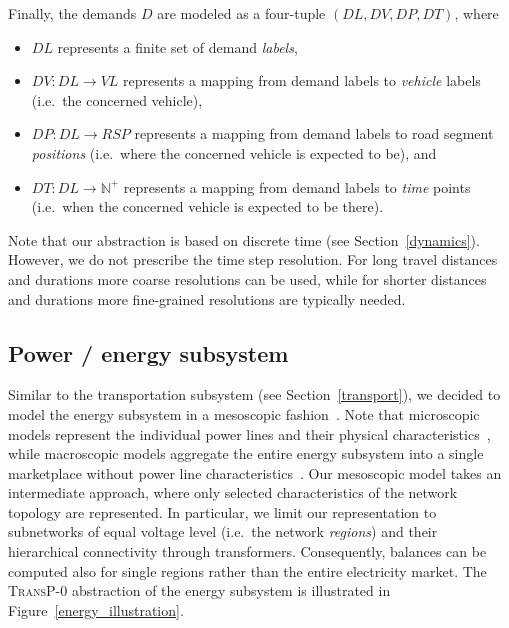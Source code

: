 Finally, the demands $D$ are modeled as a four-tuple $(DL, DV, DP, DT)$, where
\begin{itemize}
	\item $DL$ represents a finite set of demand \textit{labels},
	\item $DV: DL \rightarrow VL$ represents a mapping from demand labels to \textit{vehicle} labels (i.e.\ the concerned vehicle),
	\item $DP: DL \rightarrow RSP$ represents a mapping from demand labels to road segment \textit{positions} (i.e.\ where the concerned vehicle is expected to be), and
	\item $DT: DL \rightarrow \mathbb{N}^+$ represents a mapping from demand labels to \textit{time} points (i.e.\ when the concerned vehicle is expected to be there).
\end{itemize}
Note that our abstraction is based on discrete time (see Section~\ref{dynamics}). However, we do not prescribe the time step resolution. For long travel distances and durations more coarse resolutions can be used, while for shorter distances and durations more fine-grained resolutions are typically needed.

\subsection{Power / energy subsystem}
\label{energy_system}

Similar to the transportation subsystem (see Section~\ref{transport}), we decided to model the energy subsystem in a mesoscopic fashion~\cite{Hackenberg2012}. Note that microscopic models represent the individual power lines and their physical characteristics~\cite{Dommel1968}, while macroscopic models aggregate the entire energy subsystem into a single marketplace without power line characteristics~\cite{Castronuovo2004}. Our mesoscopic model takes an intermediate approach, where only selected characteristics of the network topology are represented. In particular, we limit our representation to subnetworks of equal voltage level (i.e.\ the network \textit{regions}) and their hierarchical connectivity through transformers. Consequently, balances can be computed also for single regions rather than the entire electricity market. The \textsc{TransP-0} abstraction of the energy subsystem is illustrated in Figure~\ref{energy_illustration}.

